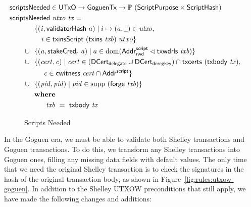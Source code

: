 \begin{figure}[htb]
  \begin{align*}
    & \hspace{-1cm}\fun{scriptsNeeded} \in \UTxO \to \GoguenTx \to \powerset (\ScriptPurpose \times \ScriptHash) \\
    & \hspace{-1cm}\fun{scriptsNeeded}~\var{utxo}~\var{tx} = \\
    & ~~\{ (\var{i}, \fun{validatorHash}~a) \mid i \mapsto (a, \wcard) \in \var{utxo},\\
    & ~~~~~i\in\fun{txinsScript}~{(\fun{txins~\var{txb}})}~{utxo}\} \\
    \cup & ~~\{ (\var{a}, \fun{stakeCred_{r}}~\var{a}) \mid a \in \dom (\AddrRWDScr
           \restrictdom \fun{txwdrls}~\var{txb}) \} \\
    \cup & ~~\{ (\var{cert}, \var{c}) \mid \var{cert} \in (\DCertDeleg \cup \DCertDeRegKey)\cap\fun{txcerts}~(\txbody{tx}), \\
    & ~~~~~~\var{c} \in \cwitness{cert} \cap \AddrScr\} \\
      \cup & ~~\{ (\var{pid}, \var{pid}) \mid \var{pid} \in \supp~(\fun{forge}~\var{txb}) \} \\
    & \where \\
    & ~~~~~~~ \var{txb}~=~\txbody{tx}
  \end{align*}
  \caption{Scripts Needed}
  \label{fig:functions-witnesses}
\end{figure}

In the Goguen era, we must be able to validate both Shelley transactions
and Goguen transactions. To do this, we transform any Shelley transactions
into Goguen ones, filling any missing data fields with default values.
The only time that we need the original Shelley transaction is to check the signatures
in the hash of the original transaction body, as shown in
Figure~\ref{fig:rules:utxow-goguen}. In addition to the Shelley UTXOW preconditions
that still apply, we have made the following changes and additions:

